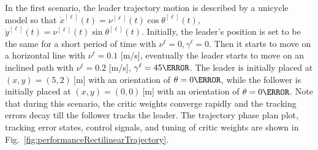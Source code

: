 \documentclass[conference]{IEEEtran}
\begin{document}
In the first scenario, the leader trajectory motion is described by a unicycle model so that %
%
$\dot x^{[\ell]}(t) = \nu^{[\ell]}(t)\cos\theta^{[\ell]}(t),$ %
$\dot y^{[\ell]}(t) = \nu^{[\ell]}(t)\sin\theta^{[\ell]}(t).$
%
Initially, the leader's position is set to be the same for a short period of time with $\nu^{\ell} = 0 , \gamma^{\ell} = 0$. Then it starts to move on a horizontal line with $\nu^{\ell} = 0.1 $ [m/s], eventually the leader starts to move on an inclined path with $\nu^{\ell} = 0.2$ [m/s], $\gamma^{\ell} = 45\degree$. The leader is initially placed at $(x,y) = (5, 2)~\si{[\meter]}$ with an orientation of $\theta = 0 \degree $, while the follower  is initially placed at $(x,y) = (0, 0)~\si{[\meter]}$ with an orientation of $\theta = 0\degree$. Note that during this scenario, the critic weights converge rapidly and the tracking errors decay till the follower tracks the leader. The trajectory phase plan plot, tracking error states, control signals, and tuning of critic weights are shown in Fig.~\ref{fig:performanceRectilinearTrajectory}. %
%
\end{document}
